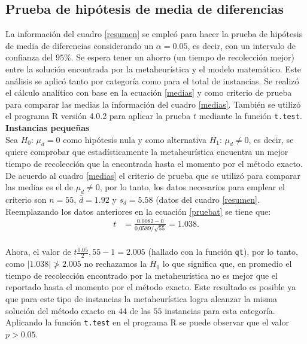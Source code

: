 \documentclass[preprint,12pt, pdftex]{elsarticle}
\begin{document}
\subsection{\textbf{Prueba de hipótesis de media de diferencias}}

La información del cuadro \ref{resumen} se empleó para hacer la prueba de hipótesis de media de diferencias considerando un $\alpha = 0.05$, es decir, con un intervalo de confianza del $95\%$. Se espera tener un ahorro (un tiempo de recolección mejor) entre la solución encontrada por la metaheurística y el modelo matemático. Este análisis se aplicó tanto por categoría como para el total de instancias. Se realizó el cálculo analítico con base en la ecuación \ref{medias} y como criterio de prueba para comparar las medias la información del cuadro \ref{medias}. También se utilizó el programa R versión 4.0.2 \cite{r} para aplicar la prueba $t$ mediante la función \texttt{t.test}. \\

\noindent \textbf{Instancias pequeñas}\\

Sea $H_{0}$: $\mu_{d} = 0$ como hipótesis nula y como alternativa $H_{1}$: $\mu_{d} \not= 0$, es decir, se quiere comprobar que estadísticamente la metaheurística encuentra un mejor tiempo de recolección que la encontrada hasta el momento por el método exacto. De acuerdo al cuadro \ref{medias} el criterio de prueba que se utilizó para comparar las medias es el de $\mu_{d} \not= 0$, por lo tanto, los datos necesarios para emplear el criterio son $n = 55$, $\bar{d} = 1.92$ y $s_{d} = 5.58$ (datos del cuadro \ref{resumen}. Reemplazando los datos anteriores en la ecuación \ref{pruebat} se tiene que:
\begin{align}
\nonumber
    t & =  \frac{0.0082 - 0}{0.0589/\sqrt{55}} =  1.038. \\ \nonumber
\end{align}

Ahora, el valor de $t\frac{0.05}{2}, 55-1 = 2.005$ (hallado con la función \texttt{qt}), por lo tanto, como $|1.038| \not> 2.005$ no rechazamos la $H_{0}$ lo que significa que, en promedio el tiempo de recolección encontrado por la metaheurística no es mejor que el reportado hasta el momento por el método exacto. Este resultado es posible ya que para este tipo de instancias la metaheurística logra alcanzar la misma solución del método exacto en $44$ de las $55$ instancias para esta categoría. Aplicando la función \texttt{t.test} en el programa R se puede observar que el valor $p > 0.05$.
\end{document}
